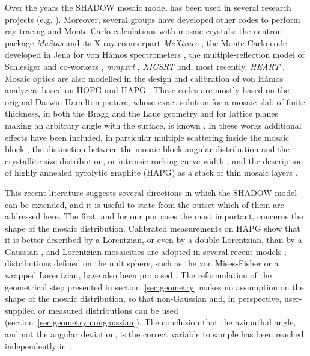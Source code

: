 \documentclass{iucr}
\begin{document}
Over the years the SHADOW mosaic model has been used in several research projects
(e.g. \cite{SanchezdelRio1998focusing}). Moreover, several groups have developed
other codes to perform ray tracing and Monte Carlo calculations with mosaic
crystals: the neutron package \emph{McStas} and its X-ray counterpart
\emph{McXtrace} \cite{Alianelli2004, BergbackKnudsen2013}, the Monte Carlo code
developed in Jena for von H\'amos spectrometers \cite{Zastrau2012, Zastrau2013},
the multiple-reflection model of Schlesiger and co-workers \cite{Schlesiger2017},
\emph{mmpxrt} \cite{Smid2021}, \emph{XICSRT} \cite{Pablant2021, Pablant2024} and,
most recently, \emph{HEART} \cite{Gawne2026}. Mosaic optics are also modelled in
the design and calibration of von H\'amos analyzers based on HOPG and HAPG
\cite{Scordo2021, Sokoltsova2022}. These codes are mostly
based on the original Darwin-Hamilton picture, whose exact solution for a mosaic
slab of finite thickness, in both the Bragg and the Laue geometry and for lattice
planes making an arbitrary angle with the surface, is known
\cite{Sears1997a, Sears1997b}. In these works additional effects
have been included, in particular multiple scattering inside the mosaic block
\cite{Wuttke2014, Bornemann2020, Schlesiger2017}, the
distinction between the mosaic-block angular distribution and the crystallite size
distribution, or intrinsic rocking-curve width
\cite{Gerlach2015, Smid2021, Alianelli2004}, and the description of highly
annealed pyrolytic graphite (HAPG) as a
stack of thin mosaic layers \cite{Zastrau2012, Zastrau2013}.

This recent literature suggests several directions in which the SHADOW model can be
extended, and it is useful to state from the outset which of them are addressed
here. The first, and for our purposes the most important, concerns the shape of the
mosaic distribution. Calibrated measurements on HAPG show that it is better
described by a Lorentzian, or even by a double Lorentzian, than by a Gaussian
\cite{Gerlach2015}, and Lorentzian mosaicities are adopted in several recent models
\cite{Schlesiger2017, Smid2021}; distributions defined on the unit sphere, such as
the von Mises-Fisher or a wrapped Lorentzian, have also been proposed
\cite{Gawne2026}. The reformulation of the geometrical step presented in
section~\ref{sec:geometry} makes no assumption on the shape of the mosaic
distribution, so that non-Gaussian and, in perspective, user-supplied or measured
distributions can be used (section~\ref{sec:geometry:nongaussian}). The conclusion
that the azimuthal angle, and not the angular deviation, is the correct variable to
sample has been reached independently in \cite{Gawne2026}.
\end{document}
